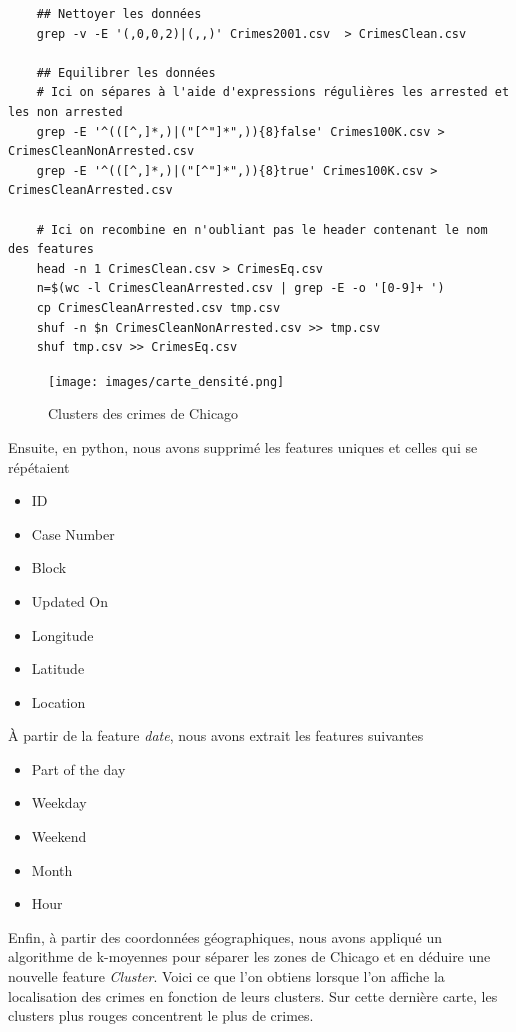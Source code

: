 \documentclass{article}
\begin{document}
    \begin{Verbatim}
    ## Nettoyer les données
    grep -v -E '(,0,0,2)|(,,)' Crimes2001.csv  > CrimesClean.csv
    
    ## Equilibrer les données
    # Ici on sépares à l'aide d'expressions régulières les arrested et les non arrested
    grep -E '^(([^,]*,)|("[^"]*",)){8}false' Crimes100K.csv > CrimesCleanNonArrested.csv
    grep -E '^(([^,]*,)|("[^"]*",)){8}true' Crimes100K.csv > CrimesCleanArrested.csv
    
    # Ici on recombine en n'oubliant pas le header contenant le nom des features
    head -n 1 CrimesClean.csv > CrimesEq.csv
    n=$(wc -l CrimesCleanArrested.csv | grep -E -o '[0-9]+ ')
    cp CrimesCleanArrested.csv tmp.csv
    shuf -n $n CrimesCleanNonArrested.csv >> tmp.csv
    shuf tmp.csv >> CrimesEq.csv
    \end{Verbatim}

    \begin{figure}
	    \centering
	    \texttt{[image: images/carte\_densité.png]}
	    \caption{Clusters des crimes de Chicago}
    \end{figure}
    Ensuite, en python, nous avons supprimé les features uniques et
    celles qui se répétaient
    \begin{itemize}
	    \item ID
	    \item Case Number
	    \item Block
	    \item Updated On
	    \item Longitude
	    \item Latitude
	    \item Location
    \end{itemize}
    À partir de la feature \textit{date}, nous avons extrait les features suivantes
    \begin{itemize}
	    \item Part of the day
	    \item Weekday
	    \item Weekend
	    \item Month
	    \item Hour
    \end{itemize}
    Enfin, à partir des coordonnées géographiques, nous avons appliqué un algorithme
    de k-moyennes pour séparer les zones de Chicago et en déduire une nouvelle
    feature \textit{Cluster}. 
    Voici ce que l'on obtiens lorsque l'on affiche la localisation des crimes en
    fonction de leurs clusters.
    Sur cette dernière carte, les clusters plus rouges concentrent le plus de crimes.
\end{document}

